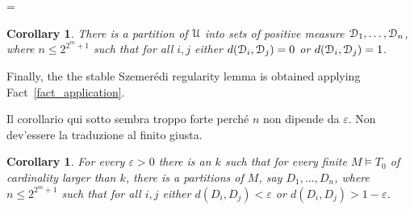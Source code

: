 \documentclass[10pt,oneside, openany]{book}
\renewcommand*{\emph}[1]{%
   \smash{\tikz[baseline]\node[rectangle, fill=green!40, rounded corners, inner xsep=0.5ex, inner ysep=0.2ex, anchor=base, minimum height = 2.7ex]{#1};}}
\def\models{\vDash}
\def\D{\EuScript D}
\def\U{\EuScript U}
\def\epsilon{\varepsilon}
\newcounter{thm}[chapter]
\theoremstyle{mio}
\newtheorem{corollary}[thm]{Corollary}
\theoremstyle{liscio}
\def\QED{\noindent\nolinebreak[4]\hfill\rlap{\ \ $\Box$}\medskip}
\begin{document}
\ceq{\hfill\emph{$d(A,B)$}}
{=}
{}

\begin{corollary}
  There is a partition of $\U$ into sets of positive measure $\D_1,\dots,\D_n$, where $n\le2^{2^m+1}$ such that for all $i,j$ either $d(\D_i, \D_j)=0$ or $d(\D_i, \D_j)=1$.
\end{corollary}


Finally, the the stable Szemer\'edi regularity lemma is obtained applying Fact~\ref{fact_application}.


\noindent{}%
Il corollario qui sotto sembra troppo forte perch\'e $n$ non dipende da $\epsilon$. Non dev'essere la traduzione al finito giusta.

\begin{corollary} 
  For every $\epsilon>0$ there is an $k$ such that for every finite $M\models T_0$ of cardinality larger than $k$, there is a partitions of $M$, say $D_1,\dots,D_n$, where $n\le2^{2^m+1}$ such that for all $i,j$ either $d(D_i,D_j)<\epsilon$ or $d(D_i,D_j)>1-\epsilon$.
  \QED
\end{corollary}
\end{document}
